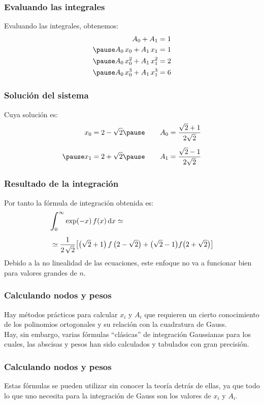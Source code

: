 \documentclass[12pt]{beamer}
\begin{document}
\begin{frame}
\frametitle{Evaluando las integrales}
Evaluando las integrales, obtenemos:
\pause
\begin{eqnarray*}
\begin{aligned}
A_{0} + A_{1} &= 1 \\ \pause
A_{0} \, x_{0} + A_{1} \, x_{1} &= 1 \\ \pause
A_{0} \, x_{0}^{2} + A_{1} \, x_{1}^{2} &= 2 \\ \pause
A_{0} \, x_{0}^{3} + A_{1} \, x_{1}^{3} &= 6
\end{aligned}
\end{eqnarray*}
\end{frame}
\begin{frame}
\frametitle{Solución del sistema}
Cuya solución es:
\pause
\begin{eqnarray*}
\begin{aligned}
x_{0} &= 2 - \sqrt{2} \pause \hspace{0.75cm} A_{0} = \dfrac{\sqrt{2} + 1}{2\sqrt{2}} \\[0.5em] \pause
x_{1} &= 2 + \sqrt{2} \pause \hspace{0.75cm} A_{1} = \dfrac{\sqrt{2} - 1}{2\sqrt{2}}
\end{aligned}
\end{eqnarray*}
\end{frame}
\begin{frame}
\frametitle{Resultado de la integración}
Por tanto la fórmula de integración obtenida es:
\pause
\begin{eqnarray*}
\begin{aligned}
&\scaleint{6ex}_{\bs 0}^{\infty} \exp(-x) \, f (x) \dd{x} \simeq \\[0.5em]
& \simeq \dfrac{1}{2 \, \sqrt{2}} \big[ \big( \sqrt{2} + 1 \big) \, f \,  \big( 2 - \sqrt{2} \big) + \big( \sqrt{2} - 1 \big) f \big( 2  + \sqrt{2} \big) \big]
\end{aligned}
\end{eqnarray*}
\pause
Debido a la no linealidad de las ecuaciones, este enfoque no va a funcionar bien para valores grandes de $n$.
\end{frame}
\begin{frame}
\frametitle{Calculando nodos y pesos}
Hay métodos prácticos para calcular $x_{i}$ y $A_{i}$ que requieren un cierto conocimiento de los polinomios ortogonales y su relación con la cuadratura de Gauss.
\\
\bigskip
\pause
Hay, sin embargo, varias fórmulas \enquote{clásicas} de integración Gaussianas para los cuales, las abscisas y pesos han sido calculados y tabulados con gran precisión.
\end{frame}
\begin{frame}
\frametitle{Calculando nodos y pesos}
Estas fórmulas se pueden utilizar sin conocer la teoría detrás de ellas, ya que todo lo que uno necesita para la integración de Gauss son los valores de $x_{i}$ y $A_{i}$.
\end{frame}
\end{document}
